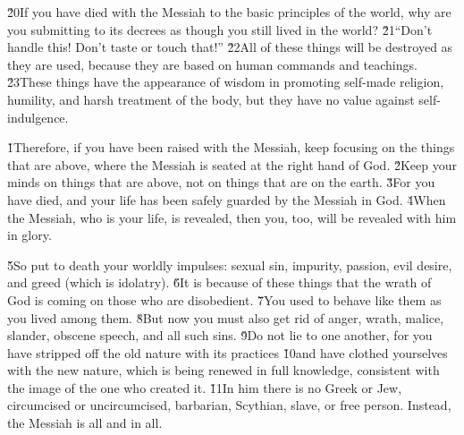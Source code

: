 \v{20}If you have died with the Messiah to the basic principles of the world, why are you submitting to its decrees as though you still lived in the world? \v{21}``Don't handle this! Don't taste or touch that!'' \v{22}All of these things will be destroyed as they are used, because they are based on human commands and teachings. \v{23}These things have the appearance of wisdom in promoting self-made religion, humility, and harsh treatment of the body, but they have no value against self-indulgence.

\v{1}Therefore, if you have been raised with the Messiah, keep focusing on the things that are above, where the Messiah is seated at the right hand of God. \v{2}Keep your minds on things that are above, not on things that are on the earth. \v{3}For you have died, and your life has been safely guarded by the Messiah in God. \v{4}When the Messiah, who is your life, is revealed, then you, too, will be revealed with him in glory.

\v{5}So put to death your worldly impulses: sexual sin, impurity, passion, evil desire, and greed (which is idolatry). \v{6}It is because of these things that the wrath of God is coming on those who are disobedient. \v{7}You used to behave like them as you lived among them. \v{8}But now you must also get rid of anger, wrath, malice, slander, obscene speech, and all such sins. \v{9}Do not lie to one another, for you have stripped off the old nature with its practices \v{10}and have clothed yourselves with the new nature, which is being renewed in full knowledge, consistent with the image of the one who created it. \v{11}In him there is no Greek or Jew, circumcised or uncircumcised, barbarian, Scythian, slave, or free person. Instead, the Messiah is all and in all.

